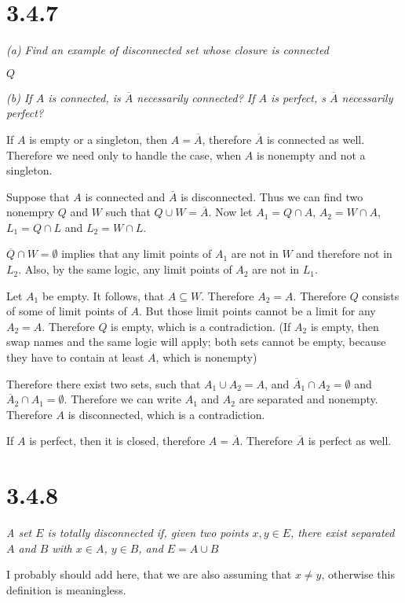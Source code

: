 \documentclass[11pt,oneside,titlepage]{article}
\begin{document}
\section*{3.4.7}
\textit{(a) Find an example of disconnected set whose closure is connected}

$Q$

\textit{(b) If $A$ is connected, is $\overline A$ necessarily connected? If
  $A$ is perfect, s $\overline A$ necessarily perfect?}

If $A$ is empty or a singleton, then $A = \overline A$, therefore $\overline
A$ is connected as well. Therefore we need only to handle the case, when
$A$ is nonempty and not a singleton.

Suppose that $A$ is connected and $\overline A$ is disconnected. Thus we can
find two nonempry $Q$ and $W$ such that $Q \cup W = \overline A$.
Now let $A_1 = Q \cap A$, $A_2 = W \cap A$, $L_1 = Q \cap L$ and
$L_2 = W \cap L$.

$\overline Q \cap W = \emptyset$ implies that any limit points of $A_1$ are
not in $W$ and therefore not in $L_2$.
Also, by the same logic, any limit points of $A_2$ are not in $L_1$.

Let $A_1$ be empty. It follows, that $A \subseteq W$. Therefore $A_2 = A$.
Therefore $Q$ consists
of some of  limit points of $A$. But those limit points cannot be a limit
for any $A_2 = A$. Therefore $Q$ is empty, which is a contradiction.
(If $A_2$ is empty, then swap names and the same logic will apply; both
sets cannot be empty, because they have to contain at least $A$, which is
nonempty)

Therefore there exist two sets, such that $A_1 \cup A_2 = A$, and
$\overline A_1 \cap A_2 = \emptyset$ and $\overline A_2 \cap A_1 = \emptyset$.
Therefore we can write $A_1$ and $A_2$ are separated and nonempty.
Therefore $A$ is disconnected, which is a contradiction.


If $A$ is perfect, then it is closed, therefore $A = \overline A$. Therefore
$\overline A$ is perfect as well.

\section*{3.4.8}
\textit{A set $E$ is totally disconnected if, given two points $x, y \in E$,
  there exist separated $A$ and $B$  with $x \in A$, $y \in B$, and
  $E = A \cup B$}

I probably should add here, that we are also assuming that $x \neq y$,
otherwise this definition is meaningless.
\end{document}
